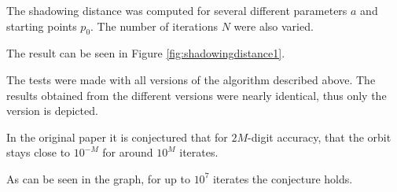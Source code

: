   The shadowing distance was computed for several different parameters $a$ and starting points $p_0$. 
  The number of iterations $N$ were also varied. 

  The result can be seen in Figure \ref{fig:shadowingdistance1}. 
  
  The tests were made with all versions of the algorithm described above.
  The results obtained from the different versions were nearly identical, thus
  only the \irram version is depicted.

  In the original paper it is conjectured that for $2M$-digit
  accuracy, that the orbit stays close to $10^{-M}$ for around $10^M$ iterates.

  As can be seen in the graph, for up to $10^7$ iterates the conjecture holds. 
